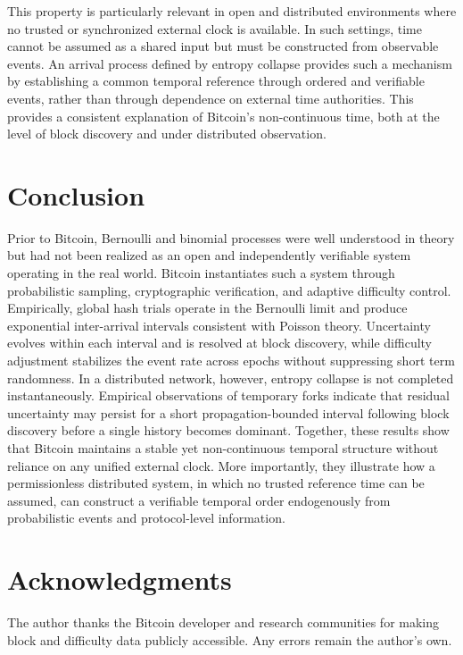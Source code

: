\documentclass[conference]{IEEEtran}
\begin{document}
This property is particularly relevant in open and distributed environments
where no trusted or synchronized external clock is available. In such settings,
time cannot be assumed as a shared input but must be constructed from observable
events. An arrival process defined by entropy collapse provides such a mechanism
by establishing a common temporal reference through ordered and verifiable
events, rather than through dependence on external time authorities.
This provides a consistent explanation of Bitcoin’s non-continuous time, both
at the level of block discovery and under distributed observation.



\section{Conclusion}

Prior to Bitcoin, Bernoulli and binomial processes were well understood in
theory but had not been realized as an open and independently verifiable system
operating in the real world. Bitcoin instantiates such a system through
probabilistic sampling, cryptographic verification, and adaptive difficulty
control. Empirically, global hash trials operate in the Bernoulli limit and
produce exponential inter-arrival intervals consistent with Poisson theory.
Uncertainty evolves within each interval and is resolved at block discovery,
while difficulty adjustment stabilizes the event rate across epochs without
suppressing short term randomness. In a distributed network, however, entropy
collapse is not completed instantaneously. Empirical observations of temporary
forks indicate that residual uncertainty may persist for a short
propagation-bounded interval following block discovery before a single history
becomes dominant. Together, these results show that Bitcoin maintains a stable yet non-continuous
temporal structure without reliance on any unified external clock. More
importantly, they illustrate how a permissionless distributed system, in which
no trusted reference time can be assumed, can construct a verifiable temporal
order endogenously from probabilistic events and protocol-level information.






\section*{Acknowledgments}

The author thanks the Bitcoin developer and research communities for making block and difficulty data publicly accessible. Any errors remain the author's own.
\end{document}
